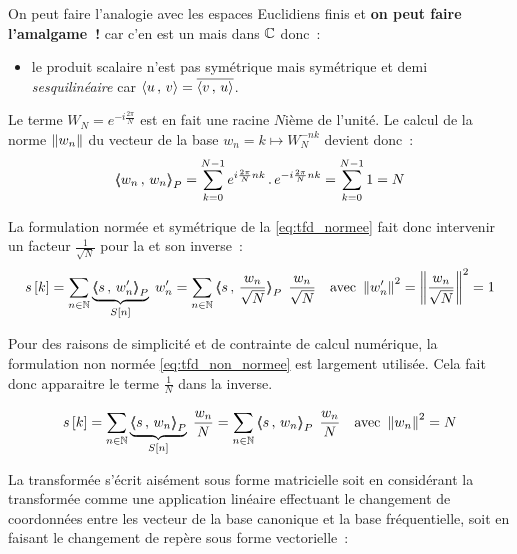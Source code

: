 

On peut faire l'analogie avec les espaces Euclidiens finis et \textbf{on peut faire l'amalgame~!} car c'en est un mais dans $\mathbb{C}$ donc~:
\begin{itemize}
\item le produit scalaire n'est pas symétrique mais \og{}symétrique et demi\fg{} \cad \emph{sesquilinéaire} car $\langle u\,,\,v\rangle=\overline{\langle v\,,\,u\rangle}$.
\end{itemize}

\begin{remarque}
  Le terme $W_N= e^{-i \frac{2 \pi}{N}}$ est en fait une racine $N$ième de l'unité. Le calcul de la norme $\left\|w_n\right\|$ du vecteur de la base $w_n=k\mapsto W_N^{-nk}$ devient donc~: $$\langle\!\!\langle w_n\,,\,w_n{\rangle\!\!\rangle}_P=\sum\limits_{k=0}^{N-1}{e^{i \frac{2 \pi}{N}nk}\,.\,e^{-i \frac{2 \pi}{N}nk}} =\sum\limits_{k=0}^{N-1}{1}=N $$

  La formulation normée et symétrique de la \TFD{} \eqref{eq:tfd_normee} fait donc intervenir un facteur $\frac{1}{\sqrt{N}}$ pour la \TFD{} et son inverse~:
\begin{eqnarray}
    \label{eq:tfd_normee}
    s\b{k} = \somme{n\in\N}{}{\caCest{\scaldp{s}{w_n'}}{S\b{n}}\; w_n'} &= \somme{n\in\N}{}{\scaldp{s}{\frac{w_n}{\sqrt{N}}}}\;\, \frac{w_n}{\sqrt{N}} &\text{avec } \norme{w_n'}^2=\norme{\frac{w_n}{\sqrt{N}}}^2=1
  \end{eqnarray}
  
  Pour des raisons de simplicité et de contrainte de calcul numérique, la formulation non normée \eqref{eq:tfd_non_normee} est largement utilisée. Cela fait donc apparaitre le terme $\frac{1}{N}$ dans la \TFD{} inverse.

  \begin{eqnarray}
    \label{eq:tfd_non_normee}
    s\b{k} = \somme{n\in\N}{}{\caCest{\scaldp{s}{w_n}}{S\b{n}}\;\frac{w_n}{N}} &= \somme{n\in\N}{}{\scaldp{s}{w_n}}\;\, \frac{w_n}{N}&\text{avec } \norme{w_n}^2=N
  \end{eqnarray}
\end{remarque}

La transformée s'écrit aisément sous forme matricielle soit en considérant la transformée comme une application linéaire effectuant le changement de coordonnées entre les vecteur de la base canonique et la base fréquentielle, soit en faisant le changement de repère sous forme vectorielle~:


